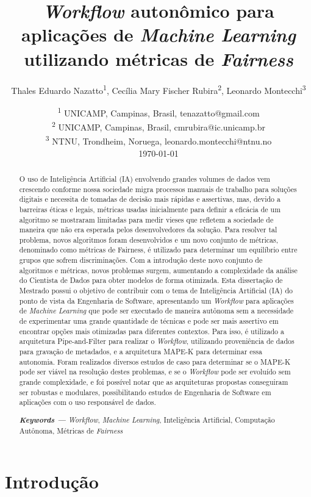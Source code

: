 \documentclass[twocolumn]{article}
\title{\textit{Workflow} autonômico para aplicações de \textit{Machine Learning} utilizando métricas de \textit{Fairness}}
\author{Thales Eduardo Nazatto\textsuperscript{1}, Cecília Mary Fischer Rubira\textsuperscript{2}, Leonardo Montecchi\textsuperscript{3}}
\date{
	\textsuperscript{1} UNICAMP, Campinas, Brasil, tenazatto@gmail.com
	\\
	\textsuperscript{2} UNICAMP, Campinas, Brasil, cmrubira@ic.unicamp.br
	\\
	\textsuperscript{3} NTNU, Trondheim, Noruega, leonardo.montecchi@ntnu.no\\[2ex]
	\today
}
\providecommand{\keywords}[1]
{
  \small	
  \textbf{\textit{Keywords ---}} #1
}
\begin{document}
\maketitle

\begin{abstract}
O uso de Inteligência Artificial (IA) envolvendo grandes volumes de dados vem crescendo conforme nossa sociedade migra processos manuais de trabalho para soluções digitais e necessita de tomadas de decisão mais rápidas e assertivas, mas, devido a barreiras éticas e legais, métricas usadas inicialmente para definir a eficácia de um algoritmo se mostraram limitadas para medir vieses que refletem a sociedade de maneira que não era esperada pelos desenvolvedores da solução. Para resolver tal problema, novos algoritmos foram desenvolvidos e um novo conjunto de métricas, denominado como métricas de Fairness, é utilizado para determinar um equilíbrio entre grupos que sofrem discriminações. Com a introdução deste novo conjunto de algoritmos e métricas, novos problemas surgem, aumentando a complexidade da análise do Cientista de Dados para obter modelos de forma otimizada. Esta dissertação de Mestrado possui o objetivo de contribuir com o tema de Inteligência Artificial (IA) do ponto de vista da Engenharia de Software, apresentando um \textit{Workflow} para aplicações de \textit{Machine Learning} que pode ser executado de maneira autônoma sem a necessidade de experimentar uma grande quantidade de técnicas e pode ser mais assertivo em encontrar opções mais otimizadas para diferentes contextos. Para isso, é utilizado a arquitetura Pipe-and-Filter para realizar o \textit{Workflow}, utilizando proveniência de dados para gravação de metadados, e a arquitetura MAPE-K para determinar essa autonomia. Foram realizados diversos estudos de caso para determinar se o MAPE-K pode ser viável na resolução destes problemas, e se o \textit{Workflow} pode ser evoluído sem grande complexidade, e foi possível notar que as arquiteturas propostas conseguiram ser robustas e modulares, possibilitando estudos de Engenharia de Software em aplicações com o uso responsável de dados.

\keywords{\textit{Workflow}, \textit{Machine Learning}, Inteligência Artificial, Computação Autônoma, Métricas de \textit{Fairness}}
\end{abstract}

\section{Introdução}
\end{document}
